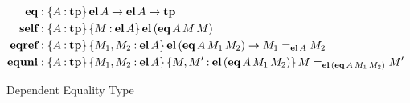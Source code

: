 \documentclass[11pt,twoside]{article}
\newcommand{\braces}[1]{\{#1\}}
\newcommand{\const}[1]{\textbf{#1}}
\newcommand{\eqclass}[3]{{#2}=_{#1}{#3}}
\newcommand{\piclass}[3]{\braces{{#2}\mathbin{:}{#1}}\,{#3}}
\newcommand{\arrclass}[2]{{#1}\to{#2}}
\newcommand{\appobj}[2]{{#1}\,{#2}}
\begin{document}
\newcommand{\eqcon}{\const{eq}}
\newcommand{\eqof}[3]{\appobj{\appobj{\appobj{\eqcon}{#1}}{#2}}{#3}}
\newcommand{\selfcon}{\const{self}}
\newcommand{\selfof}[2]{\appobj{\appobj{\selfcon}{#1}}{#2}}
\newcommand{\eqrefcon}{\const{eqref}}
\newcommand{\equnicon}{\const{equni}}

\begin{figure}
  
  \begin{align*}
    \eqcon & : \piclass{\tpsort}{A}{\arrclass{\elof{A}}{\arrclass{\elof{A}}{\tpsort}}} \\
    \selfcon & : \piclass{\tpsort}{A}{\piclass{\elof{A}}{M}{\elofp{\eqof{A}{M}{M}}}} \\
    \eqrefcon  & :
         \piclass{\tpsort}{A}{\piclass{\elof{A}}{M_{1},M_{2}}{\arrclass{\elofp{\eqof{A}{M_{1}}{M_{2}}}}{\eqclass{\elof{A}}{M_{1}}{M_{2}}}}}  \\
    \equnicon & :
          \piclass{\tpsort}{A}{\piclass{\elof{A}}{M_{1},M_{2}}{\piclass{\elofp{\eqof{A}{M_{1}}{M_{2}}}}{M,M'}{\eqclass{\elofp{\eqof{A}{M_{1}}{M_{2}}}}{M}{M'}}}}
  \end{align*}

  \caption{Dependent Equality Type}
  \label{fig:dep-eq}
\end{figure}

\newcommand{\idcon}{\const{id}}
\newcommand{\idof}[3]{\appobj{\appobj{\appobj{\idcon}{#1}}{#2}}{#3}}
\newcommand{\reflcon}{\const{refl}}
\newcommand{\reflof}[2]{\appobj{\appobj{\reflcon}{#1}}{#2}}
\newcommand{\jcon}{\const{j}}
\newcommand{\jof}[6]{\appobj{\appobj{\appobj{\appobj{\appobj{\appobj{\jcon}{#1}}{#2}}{#3}}{#4}}{#5}}{#6}}
\newcommand{\idbetacon}{\const{id-$\beta$}}
\end{document}
